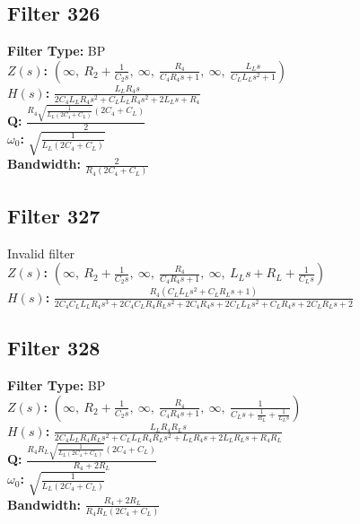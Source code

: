 \documentclass{article}
\begin{document}
\subsection*{Filter 326}
\textbf{Filter Type:} BP \\ 
\textbf{$Z(s)$:} $\left( \infty, \  R_{2} + \frac{1}{C_{2} s}, \  \infty, \  \frac{R_{4}}{C_{4} R_{4} s + 1}, \  \infty, \  \frac{L_{L} s}{C_{L} L_{L} s^{2} + 1}\right)$ \\ 
\textbf{$H(s)$:} $\frac{L_{L} R_{4} s}{2 C_{4} L_{L} R_{4} s^{2} + C_{L} L_{L} R_{4} s^{2} + 2 L_{L} s + R_{4}}$ \\ 
\textbf{Q:} $\frac{R_{4} \sqrt{\frac{1}{L_{L} \left(2 C_{4} + C_{L}\right)}} \left(2 C_{4} + C_{L}\right)}{2}$ \\ 
\textbf{$\omega_0$:} $\sqrt{\frac{1}{L_{L} \left(2 C_{4} + C_{L}\right)}}$ \\ 
\textbf{Bandwidth:} $\frac{2}{R_{4} \left(2 C_{4} + C_{L}\right)}$ \\ 
\subsection*{Filter 327}
Invalid filter \\ 
\textbf{$Z(s)$:} $\left( \infty, \  R_{2} + \frac{1}{C_{2} s}, \  \infty, \  \frac{R_{4}}{C_{4} R_{4} s + 1}, \  \infty, \  L_{L} s + R_{L} + \frac{1}{C_{L} s}\right)$ \\ 
\textbf{$H(s)$:} $\frac{R_{4} \left(C_{L} L_{L} s^{2} + C_{L} R_{L} s + 1\right)}{2 C_{4} C_{L} L_{L} R_{4} s^{3} + 2 C_{4} C_{L} R_{4} R_{L} s^{2} + 2 C_{4} R_{4} s + 2 C_{L} L_{L} s^{2} + C_{L} R_{4} s + 2 C_{L} R_{L} s + 2}$ \\ 
\subsection*{Filter 328}
\textbf{Filter Type:} BP \\ 
\textbf{$Z(s)$:} $\left( \infty, \  R_{2} + \frac{1}{C_{2} s}, \  \infty, \  \frac{R_{4}}{C_{4} R_{4} s + 1}, \  \infty, \  \frac{1}{C_{L} s + \frac{1}{R_{L}} + \frac{1}{L_{L} s}}\right)$ \\ 
\textbf{$H(s)$:} $\frac{L_{L} R_{4} R_{L} s}{2 C_{4} L_{L} R_{4} R_{L} s^{2} + C_{L} L_{L} R_{4} R_{L} s^{2} + L_{L} R_{4} s + 2 L_{L} R_{L} s + R_{4} R_{L}}$ \\ 
\textbf{Q:} $\frac{R_{4} R_{L} \sqrt{\frac{1}{L_{L} \left(2 C_{4} + C_{L}\right)}} \left(2 C_{4} + C_{L}\right)}{R_{4} + 2 R_{L}}$ \\ 
\textbf{$\omega_0$:} $\sqrt{\frac{1}{L_{L} \left(2 C_{4} + C_{L}\right)}}$ \\ 
\textbf{Bandwidth:} $\frac{R_{4} + 2 R_{L}}{R_{4} R_{L} \left(2 C_{4} + C_{L}\right)}$ \\ 
\end{document}
